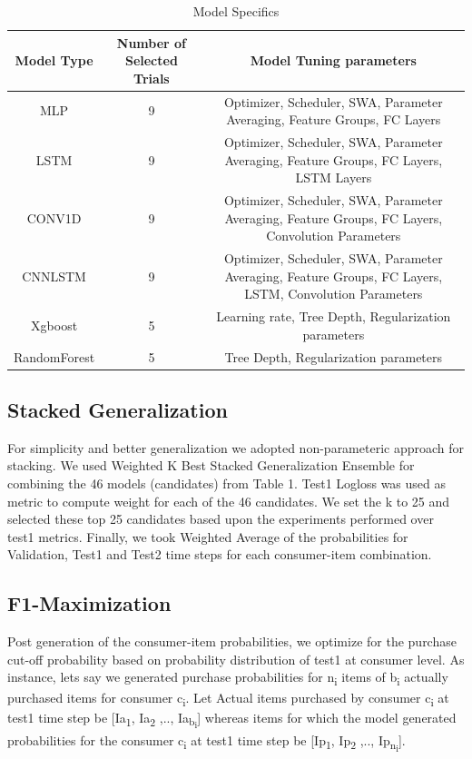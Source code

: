 \begin{table}[t]
\caption{ Model Specifics}
\vspace{0.1 in}
\centering
\resizebox{3.3in}{!}
{%
\begin{tabular}{c|c|c}
\hline
{\bf Model Type} & {\bf Number of Selected Trials} & {\bf Model Tuning parameters} \\  \hline
MLP	  		&  9 & Optimizer, Scheduler, SWA, Parameter Averaging, Feature Groups, FC Layers \\ \hline
LSTM  		& 9 & Optimizer, Scheduler, SWA, Parameter Averaging, Feature Groups, FC Layers, LSTM Layers  \\ \hline
CONV1D			& 9	& Optimizer, Scheduler, SWA, Parameter Averaging, Feature Groups, FC Layers, Convolution Parameters  \\ \hline
CNNLSTM 		& 9	& Optimizer, Scheduler, SWA, Parameter Averaging, Feature Groups, FC Layers, LSTM, Convolution Parameters  \\ \hline
Xgboost 		& 5	& Learning rate, Tree Depth, Regularization parameters  \\ \hline
RandomForest 		& 5	& Tree Depth, Regularization parameters \\ \hline
\end{tabular}
}
\label{tab:models}
\end{table}

\subsection{Stacked Generalization}
For simplicity and better generalization we adopted non-parameteric approach for stacking.
We used Weighted K Best Stacked Generalization Ensemble for combining the 46 models (candidates) from Table 1. 
Test1 Logloss was used as metric to compute weight for each of the 46 candidates. We set the k to 25 and selected 
these top 25 candidates based upon the experiments performed over test1 metrics. Finally, we took Weighted Average of 
the probabilities for Validation, Test1 and Test2 time steps for each consumer-item combination.

\subsection{F1-Maximization}
Post generation of the consumer-item probabilities, we optimize for the purchase cut-off probability based on 
probability distribution of test1 at consumer level. As instance, lets say we generated purchase probabilities for 
n\textsubscript{i} items of b\textsubscript{i} actually purchased items for consumer c\textsubscript{i}.
Let Actual items purchased by consumer c\textsubscript{i} at test1 time step be [Ia\textsubscript{1}, Ia\textsubscript{2}
,.., Ia\textsubscript{b\textsubscript{i}}] whereas items for which the model generated probabilities for the 
consumer c\textsubscript{i} at test1 time step be [Ip\textsubscript{1}, Ip\textsubscript{2} ,.., 
Ip\textsubscript{n\textsubscript{i}}]. 

